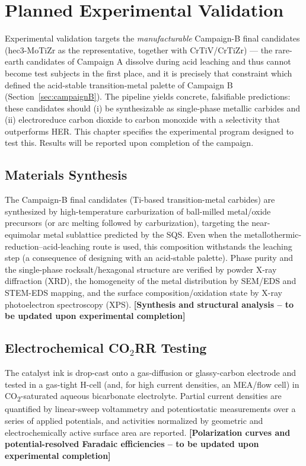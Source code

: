 \documentclass[11pt,a4paper]{report}
\newcommand{\tbu}[1]{\textcolor{red!70!black}{\textbf{[#1 -- to be updated upon experimental completion]}}}
\begin{document}
\chapter{Planned Experimental Validation}
\label{ch:experiment}

\noindent Experimental validation targets the \emph{manufacturable} Campaign-B final candidates
(hec3-MoTiZr as the representative, together with CrTiV/CrTiZr) --- the rare-earth candidates of
Campaign A dissolve during acid leaching and thus cannot become test subjects in the first place, and
it is precisely that constraint which defined the acid-stable transition-metal palette of Campaign B
(Section~\ref{sec:campaignB}). The pipeline yields concrete, falsifiable predictions: these candidates
should (i) be synthesizable as single-phase metallic carbides and (ii) electroreduce carbon dioxide to
carbon monoxide with a selectivity that outperforms HER. This chapter specifies the experimental program
designed to test this. Results will be reported upon completion of the campaign.

\section{Materials Synthesis}
The Campaign-B final candidates (Ti-based transition-metal carbides) are synthesized by high-temperature
carburization of ball-milled metal/oxide precursors (or arc melting followed by carburization), targeting
the near-equimolar metal sublattice predicted by the SQS. Even when the metallothermic-reduction--acid-leaching
route is used, this composition withstands the leaching step (a consequence of designing with an acid-stable
palette). Phase purity and the single-phase rocksalt/hexagonal structure are verified by powder X-ray
diffraction (XRD), the homogeneity of the metal distribution by SEM/EDS and STEM-EDS mapping, and the surface
composition/oxidation state by X-ray photoelectron spectroscopy (XPS). \tbu{Synthesis and structural analysis}

\section{Electrochemical CO\texorpdfstring{$_2$}{2}RR Testing}
The catalyst ink is drop-cast onto a gas-diffusion or glassy-carbon electrode and tested in a gas-tight
H-cell (and, for high current densities, an MEA/flow cell) in CO\textsubscript{2}-saturated aqueous
bicarbonate electrolyte. Partial current densities are quantified by linear-sweep voltammetry and
potentiostatic measurements over a series of applied potentials, and activities normalized by geometric
and electrochemically active surface area are reported. \tbu{Polarization curves and potential-resolved
Faradaic efficiencies}
\end{document}
